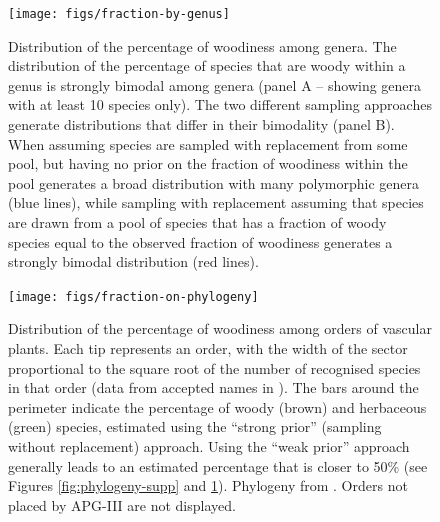 \documentclass[a4paper,12pt]{article}
\begin{document}



\begin{figure}[p]
  \centering
  \texttt{[image: figs/fraction-by-genus]}
  \caption{Distribution of the percentage of woodiness among genera.
    The distribution of the percentage of species that are woody within
    a genus is strongly bimodal among genera (panel A -- showing
    genera with at least 10 species only).
    The two different sampling approaches generate distributions that
    differ in their bimodality (panel B). When assuming species are
    sampled with replacement from some pool, but having no prior on
    the fraction of woodiness within the pool generates a broad
    distribution with many polymorphic genera (blue lines), while
    sampling with replacement assuming that species are drawn from a
    pool of species that has a fraction of woody species equal to the
    observed fraction of woodiness generates a strongly bimodal
    distribution (red lines).}
  \label{fig:distribution-genera}
\end{figure}

\begin{figure}[p]
  \centering
  \texttt{[image: figs/fraction-on-phylogeny]}
  \caption{Distribution of the percentage of woodiness among orders of
    vascular plants.  Each tip represents an order, with the width of
    the sector proportional to the square root of the number of
    recognised species in that order (data from accepted names in
    \citet{ThePlantList}).  The bars around the perimeter indicate the
    percentage of woody (brown) and herbaceous (green) species,
    estimated using the ``strong prior'' (sampling without
    replacement) approach.  Using the ``weak prior'' approach
    generally leads to an estimated percentage that is closer to 50\%
    (see Figures \ref{fig:phylogeny-supp} and
    \ref{fig:distribution-genera}).  Phylogeny from \citep{Zanne}.
    Orders not placed by APG-III \citep{APG3} are not displayed.}
\label{fig:phylogeny}
\end{figure}
\end{document}
